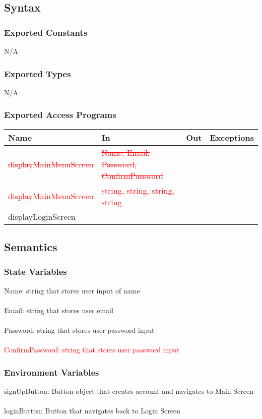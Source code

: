 \documentclass[12pt, titlepage]{article}
\begin{document}
\subsection{Syntax}

\subsubsection{Exported Constants}
N/A

\subsubsection{Exported Types}
N/A

\subsubsection{Exported Access Programs}

\begin{tabular}{| l | l | l | l |}
	\hline
	{\textbf{Name}} & {\textbf{In}} & {\textbf{Out}} & {\textbf{Exceptions}}\\
	\hline
	{\textcolor{red}{\sout{displayMainMenuScreen}}} & {\textcolor{red}{\sout{Name, Email, Password, ConfirmPassword}}} & & \\
	\hline
	{\textcolor{red}{displayMainMenuScreen}} & {\textcolor{red}{string, string, string, string}} & & \\
	\hline
	{displayLoginScreen} & & & \\
	\hline
\end{tabular}

\subsection{Semantics}

\subsubsection{State Variables}
Name: string that stores user input of name\\\\
Email: string that stores user email\\\\
Password: string that stores user password input\\\\
{\textcolor{red}{ConfirmPassword: string that stores user password input}}

\subsubsection{Environment Variables}
signUpButton: Button object that creates account and navigates to Main Screen\\\\
loginButton: Button that navigates back to Login Screen\\\\
\end{document}
